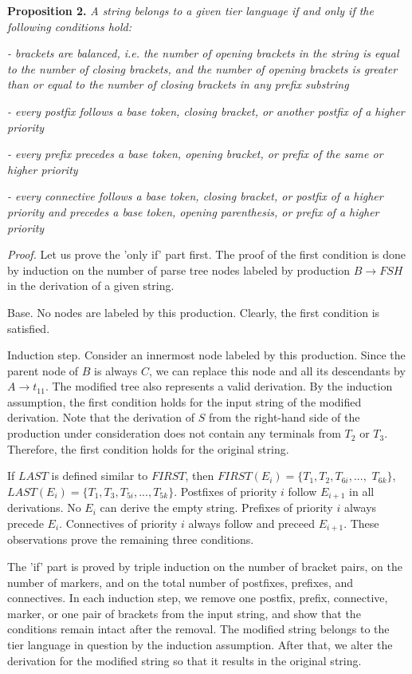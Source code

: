 \documentclass{llncs}
\begin{document}
\noindent
\textbf{Proposition 2.} \textit{A string belongs to a given tier language if and only if the following conditions hold:}

\noindent
\textit{- brackets are balanced, i.e. the number of opening brackets in the string is equal to the number of closing brackets, and the number of opening brackets is greater than or equal to the number of closing brackets in any prefix substring}

\noindent
\textit{- every postfix follows a base token, closing bracket, or another postfix of a higher priority}

\noindent
\textit{- every prefix precedes a base token, opening bracket, or prefix of the same or higher priority}

\noindent
\textit{- every connective follows a base token, closing bracket, or postfix of a higher priority and precedes a base token, opening parenthesis, or prefix of a higher priority}

\noindent
\textit{Proof.} Let us prove the 'only if' part first. The proof of the first condition is done by induction on the number of parse tree nodes labeled by production $B \rightarrow F S H$ in the derivation of a given string. 

Base. No nodes are labeled by this production. Clearly, the first condition is satisfied.

Induction step. Consider an innermost node labeled by this production. Since the parent node of $B$ is always $C$, we can replace this node and all its descendants by $A \rightarrow t_{11}$. The modified tree also represents a valid derivation. By the induction assumption, the first condition holds for the input string of the modified derivation. Note that the derivation of $S$ from the right-hand side of the production under consideration does not contain any terminals from $T_2$ or $T_3$. Therefore, the first condition holds for the original string.

If $LAST$ is defined similar to $FIRST$, then 
$FIRST(E_i) = \{ T_1, T_2, T_{6i},...,$ $T_{6k}\}$,
$LAST(E_i) = \{ T_1, T_3, T_{5i},...,T_{5k} \}$.
Postfixes of priority $i$ follow $E_{i+1}$ in all derivations. No $E_i$ can derive the empty string. Prefixes of priority $i$ always precede $E_i$. Connectives of priority $i$ always follow and preceed $E_{i+1}$. These observations prove the remaining three conditions.

The 'if' part is proved by triple induction on the number of bracket pairs, on the number of markers, and on the total number of postfixes, prefixes, and connectives. In each induction step, we remove one postfix, prefix, connective, marker, or one pair of brackets from the input string, and show that the conditions remain intact after the removal. The modified string belongs to the tier language in question by the induction assumption. After that, we alter the derivation for the modified string so that it results in the original string. 
\end{document}
